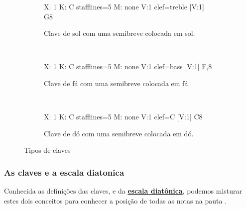 \begin{figure}[h]
    \centering
\begin{subfigure}[c]{0.25\textwidth}
\begin{abc}[name=abc-clavesol]
%
X: 1 %
K: C stafflines=5 %
M: none %
V:1 clef=treble %
%
[V:1] G8
\end{abc}
\caption{Clave de sol com uma semibreve colocada em sol.}
\label{fig:abc-clavesol}
\end{subfigure}
~ %
\begin{subfigure}[c]{0.25\textwidth}
\begin{abc}[name=abc-clavefa]
%
X: 1 %
K: C stafflines=5 %
M: none %
V:1 clef=bass %
%
[V:1] F,8  
\end{abc}
\caption{Clave de fá com uma semibreve colocada em fá.}
\label{fig:abc-clavefa}
\end{subfigure}
~ %
\begin{subfigure}[c]{0.25\textwidth}
\begin{abc}[name=abc-clavedo]
%
X: 1 %
K: C stafflines=5 %
M: none %
V:1 clef=C %
%
[V:1] C8 
\end{abc}
\caption{Clave de dó com uma semibreve colocada em dó.}
\label{fig:abc-clavedo}
\end{subfigure}
    \caption{Tipos de claves}\label{fig:allclaves}
\end{figure}



\subsubsection{As claves e a escala diatonica}
Conhecida as definições das claves, e da \hyperref[sec:pos:Diatonica]{\textbf{escala diatônica}}, 
podemos misturar estes dois conceitos para conhecer a posição de todas as notas na pauta
\cite[pp. 10]{cardoso1973curso} \cite[pp. 14]{medteoria}.

